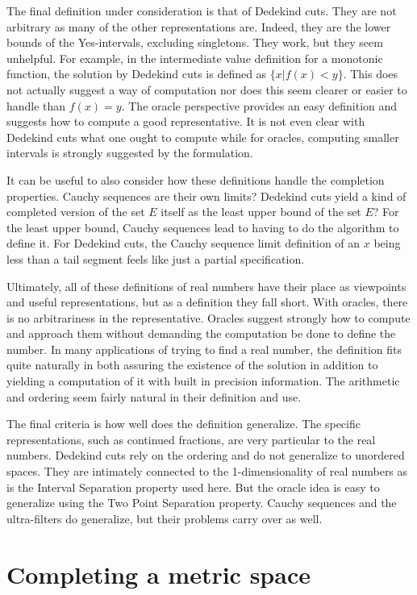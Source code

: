 \documentclass[12pt]{article}
\theoremstyle{remark}
\begin{document}
The final definition under consideration is that of Dedekind cuts. They are not arbitrary as many of the other representations are. Indeed, they are the lower bounds of the Yes-intervals, excluding singletons. They work, but they seem unhelpful. For example, in the intermediate value definition for a monotonic function, the solution by Dedekind cuts is defined as $\{x | f(x) < y\}$. This does not actually suggest a way of computation nor does this seem clearer or easier to handle than $f(x) = y$. The oracle perspective provides an easy definition and suggests how to compute a good representative. It is not even clear with Dedekind cuts what one ought to compute while for oracles, computing smaller intervals is strongly suggested by the formulation. 

It can be useful to also consider how these definitions handle the completion properties. Cauchy sequences are their own limits? Dedekind cuts yield a kind of completed version of the set $E$ itself as the least upper bound of the set $E$? For the least upper bound, Cauchy sequences lead to having to do the algorithm to define it. For Dedekind cuts, the Cauchy sequence limit definition of an $x$ being less than a tail segment feels like just a partial specification. 

Ultimately, all of these definitions of real numbers have their place as viewpoints and useful representations, but as a definition they fall short. With oracles, there is no arbitrariness in the representative. Oracles suggest strongly how to compute and approach them without demanding the computation be done to define the number. In many applications of trying to find a real number, the definition fits quite naturally in both assuring the existence of the solution in addition to yielding a computation of it with built in precision information. The arithmetic and ordering seem fairly natural in their definition and use. 

The final criteria is how well does the definition generalize. The specific representations, such as continued fractions, are very particular to the real numbers. Dedekind cuts rely on the ordering and do not generalize to unordered spaces. They are intimately connected to the 1-dimensionality of real numbers as is the Interval Separation property used here. But the oracle idea is easy to generalize using the Two Point Separation property. Cauchy sequences and the ultra-filters do generalize, but their problems carry over as well. 

\section{Completing a metric space}
\end{document}
